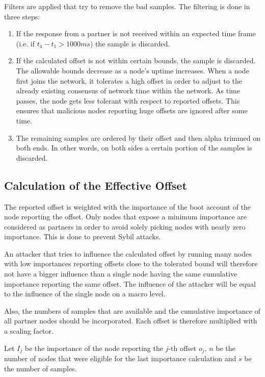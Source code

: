 Filters are applied that try to remove the bad samples. The filtering is done in three steps:
\begin{enumerate}
	\item{If the response from a partner is not received within an expected time frame (i.e. if $t_4-t_1 > 1000ms$) the sample is discarded.}
	\item{
		If the calculated offset is not within certain bounds, the sample is discarded.
		The allowable bounds decrease as a node's uptime increases.
		When a node first joins the network, it tolerates a high offset in order to adjust to the already existing consensus of network time within the network.
		As time passes, the node gets less tolerant with respect to reported offsets.
		This ensures that malicious nodes reporting huge offsets are ignored after some time.
	}
	\item{
		The remaining samples are ordered by their offset and then alpha trimmed on both ends.
		In other words, on both sides a certain portion of the samples is discarded.
	}
\end{enumerate}

\subsection{Calculation of the Effective Offset}

The reported offset is weighted with the importance of the boot account of the node reporting the offset.
Only nodes that expose a minimum importance are considered as partners in order to avoid solely picking nodes with nearly zero importance.
This is done to prevent Sybil attacks.

An attacker that tries to influence the calculated offset by running many nodes with low importances reporting offsets close to the tolerated bound will therefore not have a bigger influence than a single node having the same cumulative importance reporting the same offset.
The influence of the attacker will be equal to the influence of the single node on a macro level.

Also, the numbers of samples that are available and the cumulative importance of all partner nodes should be incorporated.
Each offset is therefore multiplied with a scaling factor.

Let $I_j$ be the importance of the node reporting the $j$-th offset $o_j$,
$n$ be the number of nodes that were eligible for the last importance calculation and $s$ be the number of samples.


